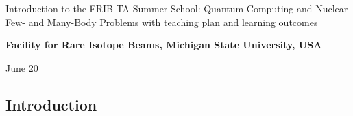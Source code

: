 \documentclass[%
oneside,                 %
final,                   %
10pt]{article}
\begin{document}

\newcommand{\exercisesection}[1]{\subsection*{#1}}






\thispagestyle{empty}

\begin{center}
{\LARGE\bf
\begin{spacing}{1.25}
Introduction to the FRIB-TA Summer School: Quantum Computing and Nuclear Few- and Many-Body Problems with teaching plan and learning outcomes
\end{spacing}
}
\end{center}


\begin{center}
{\bf Facility for Rare Isotope Beams, Michigan State University, USA${}^{}$} \\ [0mm]
\end{center}

\begin{center}
\end{center}
    

\begin{center}
June 20
\end{center}

\vspace{1cm}


\subsection{Introduction}
\end{document}
